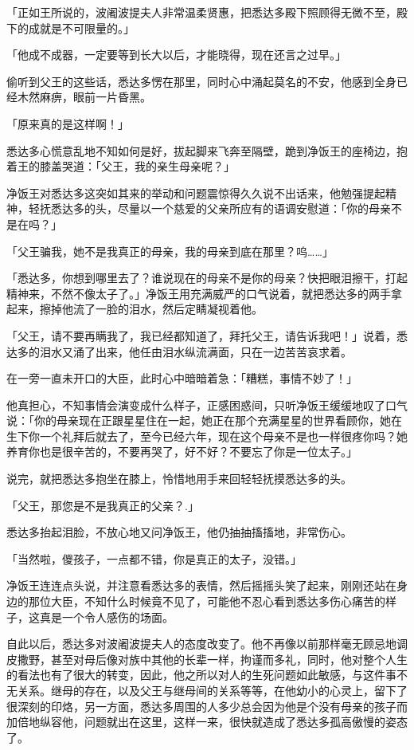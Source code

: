 \documentclass[12pt,twoside,openany]{book}
\begin{document}
「正如王所说的，波阇波提夫人非常温柔贤惠，把悉达多殿下照顾得无微不至，殿下的成就是不可限量的。」

「他成不成器，一定要等到长大以后，才能晓得，现在还言之过早。」

偷听到父王的这些话，悉达多愣在那里，同时心中涌起莫名的不安，他感到全身已经木然麻痹，眼前一片昏黑。

「原来真的是这样啊！」

悉达多心慌意乱地不知如何是好，拔起脚来飞奔至隔壁，跪到净饭王的座椅边，抱着王的膝盖哭道：「父王，我的亲生母亲呢？」

净饭王对悉达多这突如其来的举动和问题震惊得久久说不出话来，他勉强提起精神，轻抚悉达多的头，尽量以一个慈爱的父亲所应有的语调安慰道：「你的母亲不是在吗？」

「父王骗我，她不是我真正的母亲，我的母亲到底在那里？呜……」

「悉达多，你想到哪里去了？谁说现在的母亲不是你的母亲？快把眼泪擦干，打起精神来，不然不像太子了。」净饭王用充满威严的口气说着，就把悉达多的两手拿起来，擦掉他流了一脸的泪水，然后定睛凝视着他。

「父王，请不要再瞒我了，我已经都知道了，拜托父王，请告诉我吧！」说着，悉达多的泪水又涌了出来，他任由泪水纵流满面，只在一边苦苦哀求着。

在一旁一直未开口的大臣，此时心中暗暗着急：「糟糕，事情不妙了！」

他真担心，不知事情会演变成什么样子，正感困惑间，只听净饭王缓缓地叹了口气说：「你的母亲现在正跟星星住在一起，她正在那个充满星星的世界看顾你，她在生下你一个礼拜后就去了，至今已经六年，现在这个母亲不是也一样很疼你吗？她养育你也是很辛苦的，不要再哭了，好不好？不要忘了你是一位太子。」

说完，就把悉达多抱坐在膝上，怜惜地用手来回轻轻抚摸悉达多的头。

「父王，那您是不是我真正的父亲？.」

悉达多抬起泪脸，不放心地又问净饭王，他仍抽抽搐搐地，非常伤心。

「当然啦，儍孩子，一点都不错，你是真正的太子，没错。」

净饭王连连点头说，并注意看悉达多的表情，然后摇摇头笑了起来，刚刚还站在身边的那位大臣，不知什么时候竟不见了，可能他不忍心看到悉达多伤心痛苦的样子，这真是一个令人感伤的场面。

自此以后，悉达多对波阇波提夫人的态度改变了。他不再像以前那样毫无顾忌地调皮撒野，甚至对母后像对族中其他的长辈一样，拘谨而多礼，同时，他对整个人生的看法也有了很大的转变，因此，他之所以对人的生死问题如此敏感，与这件事不无关系。继母的存在，以及父王与继母间的关系等等，在他幼小的心灵上，留下了很深刻的印烙，另一方面，悉达多周围的人多少总会因为他是个没有母亲的孩子而加倍地纵容他，问题就出在这里，这样一来，很快就造成了悉达多孤高傲慢的姿态了。
\end{document}
